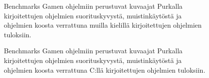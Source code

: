 \begin{figure}[ht!]
    \begin{adjustbox}{center}
    \begin{minipage}{1.15\textwidth}
    \begin{minipage}{0.5\textwidth}
        
        \vspace*{-0.8cm}
    \end{minipage}
    \begin{minipage}{0.5\textwidth}
        
        \vspace*{-0.9cm}
    \end{minipage}
    \end{minipage}
    \end{adjustbox}

    \caption{
        Benchmarks Gamen ohjelmiin perustuvat kuvaajat Purkalla kirjoitettujen
        ohjelmien suorituskyvystä, muistinkäytöstä ja ohjelmien koosta
        verrattuna muilla kielillä kirjoitettujen ohjelmien tuloksiin.}
    \label{fig:purkkabenchmarksgame}
\end{figure}

\begin{figure}[ht!]
    \begin{adjustbox}{center}
        \begin{minipage}{1.25\textwidth}
        
        \end{minipage}
    \end{adjustbox}

    \begin{adjustbox}{center}
        \begin{minipage}{1.25\textwidth}
        
        \end{minipage}
    \end{adjustbox}

    \begin{adjustbox}{center}
        \begin{minipage}{1.25\textwidth}
        
        \end{minipage}
    \end{adjustbox}
    \caption{
        Benchmarks Gamen ohjelmiin perustuvat kuvaajat Purkalla kirjoitettujen ohjelmien
        suorituskyvystä, muistinkäytöstä ja ohjelmien koosta verrattuna C:llä
        kirjoitettujen ohjelmien tuloksiin.}
    \label{fig:purkkabenchmarksgame2}
\end{figure}


